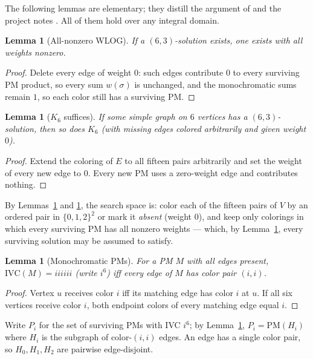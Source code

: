 \documentclass[11pt]{article}
\newtheorem{lemma}[theorem]{Lemma}
\theoremstyle{definition}
\begin{document}
The following lemmas are elementary; they distill the argument of
\cite{KGS19} and the project notes \cite{notes}. All of them hold over
any integral domain.

\begin{lemma}[All-nonzero WLOG]\label{lem:nonzero}
If a $(6,3)$-solution exists, one exists with all weights nonzero.
\end{lemma}
\begin{proof}
Delete every edge of weight $0$: such edges contribute $0$ to every
surviving PM product, so every sum $w(\sigma)$ is unchanged, and the
monochromatic sums remain $1$, so each color still has a surviving PM.
\end{proof}

\begin{lemma}[$K_6$ suffices]\label{lem:k6}
If some simple graph on $6$ vertices has a $(6,3)$-solution, then so
does $K_6$ (with missing edges colored arbitrarily and given weight
$0$).
\end{lemma}
\begin{proof}
Extend the coloring of $E$ to all fifteen pairs arbitrarily and set the
weight of every new edge to $0$. Every new PM uses a zero-weight edge
and contributes nothing.
\end{proof}

By Lemmas~\ref{lem:nonzero} and \ref{lem:k6}, the search space is:
color each of the fifteen pairs of $V$ by an ordered pair in
$\{0,1,2\}^2$ or mark it \emph{absent} (weight $0$), and keep only
colorings in which every surviving PM has all nonzero weights --- which,
by Lemma~\ref{lem:nonzero}, every surviving solution may be assumed to
satisfy.

\begin{lemma}[Monochromatic PMs]\label{lem:mono}
For a PM $M$ with all edges present,
$\mathrm{IVC}(M)=iiiiii$ (write $i^6$) iff every edge of $M$ has color
pair $(i,i)$.
\end{lemma}
\begin{proof}
Vertex $u$ receives color $i$ iff its matching edge has color $i$ at
$u$. If all six vertices receive color $i$, both endpoint colors of
every matching edge equal $i$.
\end{proof}

Write $P_i$ for the set of surviving PMs with IVC $i^6$; by
Lemma~\ref{lem:mono}, $P_i=\mathrm{PM}(H_i)$ where $H_i$ is the subgraph
of color-$(i,i)$ edges. An edge has a single color pair, so $H_0,H_1,H_2$
are pairwise edge-disjoint.
\end{document}
